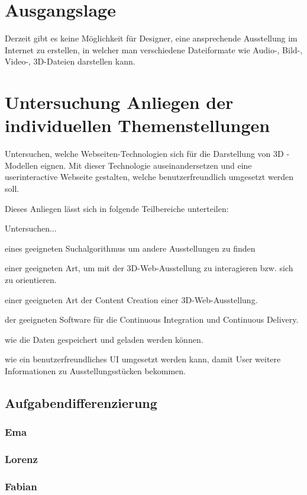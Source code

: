 \section{Ausgangslage}
Derzeit gibt es keine Möglichkeit für Designer, eine ansprechende Ausstellung im Internet zu erstellen, in welcher man verschiedene Dateiformate wie Audio-, Bild-, Video-, 3D-Dateien darstellen kann.

\section{Untersuchung Anliegen der individuellen Themenstellungen}
Untersuchen, welche Webseiten-Technologien sich für die Darstellung von 3D - Modellen eignen. Mit dieser Technologie auseinandersetzen und eine userinteractive Webseite gestalten, welche benutzerfreundlich umgesetzt werden soll.

Dieses Anliegen lässt sich in folgende Teilbereiche unterteilen:

Untersuchen...
\begin{compactitem}
    \item eines geeigneten Suchalgorithmus um andere Ausstellungen zu finden
    \item einer geeigneten Art, um mit der 3D-Web-Ausstellung zu interagieren bzw. sich zu orientieren.
    \item einer geeigneten Art der Content Creation einer 3D-Web-Ausstellung.
    \item der geeigneten Software für die Continuous Integration und Continuous Delivery.
    \item wie die Daten gespeichert und geladen werden können.
    \item wie ein benutzerfreundliches UI umgesetzt werden kann, damit User weitere Informationen zu Ausstellungsstücken bekommen.
\end{compactitem}

\subsection{Aufgabendifferenzierung}
\subsubsection{Ema}
\subsubsection{Lorenz}
\subsubsection{Fabian}
	
